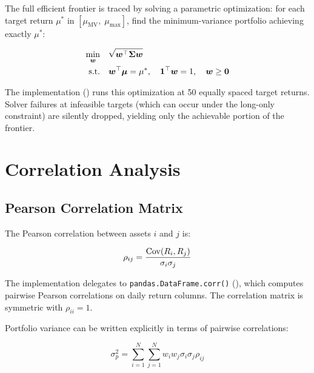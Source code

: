 The full efficient frontier is traced by solving a parametric optimization: for each target return $\mu^*$ in $[\mu_{\text{MV}},\; \mu_{\text{max}}]$, find the minimum-variance portfolio achieving exactly $\mu^*$:

\begin{align}
  \min_{\boldsymbol{w}} \quad & \sqrt{\boldsymbol{w}^{\top}\mathbf{\Sigma}\boldsymbol{w}} \notag \\
  \text{s.t.} \quad & \boldsymbol{w}^{\top}\boldsymbol{\mu} = \mu^*, \quad \boldsymbol{1}^{\top}\boldsymbol{w} = 1, \quad \boldsymbol{w} \geq \boldsymbol{0}
  \label{eq:frontier-para}
\end{align}

The implementation () runs this optimization at 50 equally spaced target returns. Solver failures at infeasible targets (which can occur under the long-only constraint) are silently dropped, yielding only the achievable portion of the frontier.

\section{Correlation Analysis}
\label{sec:portfolio-correlation}


\subsection{Pearson Correlation Matrix}

The Pearson correlation between assets $i$ and $j$ is:

\begin{equation}
  \rho_{ij} = \frac{\operatorname{Cov}(R_i, R_j)}{\sigma_i \sigma_j}
  \label{eq:pearson}
\end{equation}

The implementation delegates to \texttt{pandas.DataFrame.corr()} (), which computes pairwise Pearson correlations on daily return columns. The correlation matrix is symmetric with $\rho_{ii} = 1$.

Portfolio variance can be written explicitly in terms of pairwise correlations:

\begin{equation}
  \sigma_p^2 = \sum_{i=1}^{N}\sum_{j=1}^{N} w_i w_j \sigma_i \sigma_j \rho_{ij}
  \label{eq:port-var-corr}
\end{equation}

